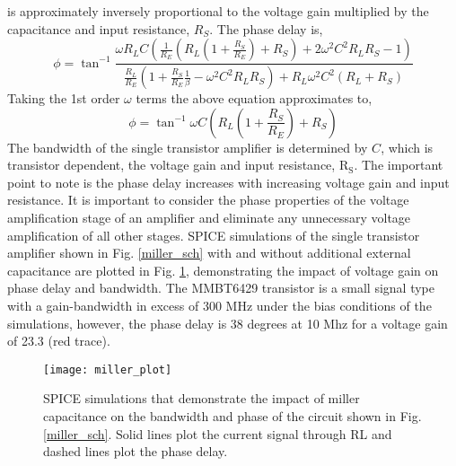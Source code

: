 \documentclass[a4paper,10pt, oneside]{article}
\begin{document}
is approximately inversely proportional to the voltage gain multiplied by the capacitance and input resistance, $R_{S}$. The phase delay is,
\begin{equation}
\phi=\tan^{-1}\frac{\omega R_{L}C\left(\frac{1}{R_{E}}\left(R_{L}\left(1+\frac{R_{S}}{R_{E}}\right)+R_{S}\right)+2\omega^{2}C^{2}R_{L}R_{S}-1\right) }{\frac{R_{L}}{R_{E}}\left(1+\frac{R_{S}}{R_{E}}\frac{1}{\beta}-\omega^{2}C^{2}R_{L}R_{S}\right)+R_{L}\omega^{2}C^{2}(R_{L}+R_{S})}
\end{equation}
Taking the 1st order $\omega$ terms the above equation approximates to,
\begin{equation}
\phi = \tan^{-1}\omega C\left(R_{L}\left(1+\frac{R_{S}}{R_{E}}\right)+R_{S}\right)
\end{equation}
The bandwidth of the single transistor amplifier is determined by $C$, which is transistor dependent, the voltage gain and input resistance, R$_{\textrm{S}}$.
The important point to note is the phase delay increases with increasing voltage gain and input resistance.  
It is important to consider the phase properties of the voltage amplification stage of an amplifier and eliminate any unnecessary voltage amplification of all other stages. SPICE simulations of the single transistor amplifier shown in Fig. \ref{miller_sch} with and without additional external capacitance are plotted in Fig. \ref{miller}, demonstrating the impact of voltage gain on phase delay and bandwidth. The MMBT6429 transistor is a small signal type with a gain-bandwidth in excess of 300 MHz under the bias conditions of the simulations, however, the phase delay is 38 degrees at 10 Mhz for a voltage gain of 23.3 (red trace). 
\begin{figure}[H]
\begin{centering}
	\texttt{[image: miller\_plot]}
	\caption{SPICE simulations that demonstrate the impact of miller capacitance on the bandwidth and phase of the circuit shown in Fig. \ref{miller_sch}. Solid lines plot the current signal through RL and dashed lines plot the phase delay.}\label{miller}
\end{centering}	
\end{figure}
\end{document}
